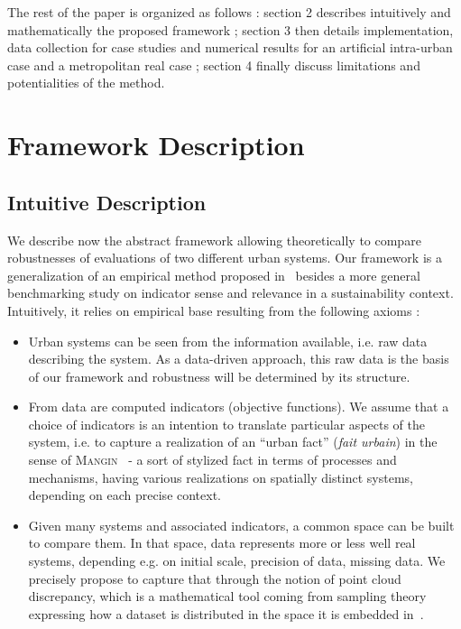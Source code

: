 \documentclass[runningheads,a4paper]{llncs2e/llncs}
\newcommand{\noun}[1]{\textsc{#1}}
\begin{document}
\bigskip

The rest of the paper is organized as follows : section 2 describes intuitively and mathematically the proposed framework ; section 3 then details implementation, data collection for case studies and numerical results for an artificial intra-urban case and a metropolitan real case ; section 4 finally discuss limitations and potentialities of the method.





\section{Framework Description}


\subsection{Intuitive Description}


We describe now the abstract framework allowing theoretically to compare robustnesses of evaluations of two different urban systems. Our framework is a generalization of an empirical method proposed in~\cite{ecodistrictReport} besides a more general benchmarking study on indicator sense and relevance in a sustainability context. Intuitively, it relies on empirical base resulting from the following axioms :
\begin{itemize}
\item Urban systems can be seen from the information available, i.e. raw data describing the system. As a data-driven approach, this raw data is the basis of our framework and robustness will be determined by its structure.
\item From data are computed indicators (objective functions). We assume that a choice of indicators is an intention to translate particular aspects of the system, i.e. to capture a realization of an ``urban fact'' (\emph{fait urbain}) in the sense of \noun{Mangin}~\cite{mangin1999projet} - a sort of stylized fact in terms of processes and mechanisms, having various realizations on spatially distinct systems, depending on each precise context.
\item Given many systems and associated indicators, a common space can be built to compare them. In that space, data represents more or less well real systems, depending e.g. on initial scale, precision of data, missing data. We precisely propose to capture that through the notion of point cloud discrepancy, which is a mathematical tool coming from sampling theory expressing how a dataset is distributed in the space it is embedded in~\cite{dick2010digital}. %
\end{itemize}
\end{document}
